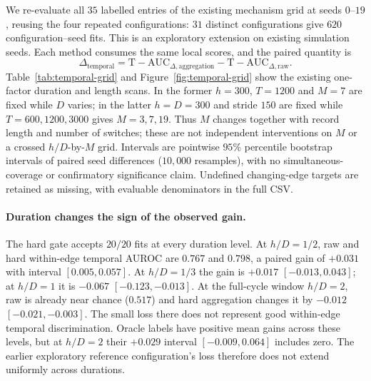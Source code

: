 \documentclass[11pt]{article}
\begin{document}
We re-evaluate all $35$ labelled entries of the existing mechanism grid at seeds
$0$--$19$, reusing the four repeated configurations: $31$ distinct configurations
give $620$ configuration--seed fits. This is an exploratory extension on existing
simulation seeds. Each method consumes the same local scores, and the paired
quantity is
\begin{equation}
\Delta_{\mathrm{temporal}}
=\mathrm{T\!-\!AUC}_{\Delta,\mathrm{aggregation}}
-\mathrm{T\!-\!AUC}_{\Delta,\mathrm{raw}}.
\label{eq:temporal-gain}
\end{equation}
Table~\ref{tab:temporal-grid} and Figure~\ref{fig:temporal-grid} show the existing
one-factor duration and length scans. In the former $h=300$, $T=1200$ and $M=7$
are fixed while $D$ varies; in the latter $h=D=300$ and stride $150$ are fixed
while $T=600,1200,3000$ gives $M=3,7,19$. Thus $M$ changes together with record
length and number of switches; these are not independent interventions on $M$
or a crossed $h/D$-by-$M$ grid. Intervals are pointwise $95\%$ percentile
bootstrap intervals of paired seed differences ($10{,}000$ resamples), with no
simultaneous-coverage or confirmatory significance claim. Undefined changing-edge
targets are retained as missing, with evaluable denominators in the full CSV.

\paragraph{Duration changes the sign of the observed gain.}
The hard gate accepts $20/20$ fits at every duration level. At $h/D=1/2$,
raw and hard within-edge temporal AUROC are $0.767$ and $0.798$, a paired gain of $+0.031$
with interval $[0.005,0.057]$. At $h/D=1/3$ the gain is $+0.017$
$[-0.013,0.043]$; at $h/D=1$ it is $-0.067$ $[-0.123,-0.013]$.
At the full-cycle window $h/D=2$, raw is already near chance ($0.517$) and
hard aggregation changes it by $-0.012$ $[-0.021,-0.003]$. The small loss there
does not represent good within-edge temporal discrimination. Oracle labels have positive mean
gains across these levels, but at $h/D=2$ their $+0.029$ interval
$[-0.009,0.064]$ includes zero. The earlier exploratory reference configuration's loss therefore does
not extend uniformly across durations.
\end{document}
